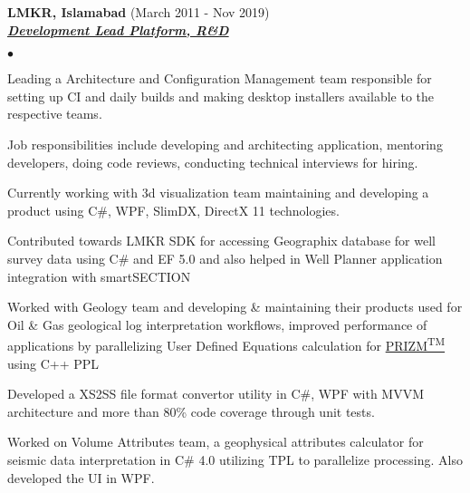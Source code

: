 \documentclass{article}
\newcommand{\employer}[3]{{ \textbf{#1} (#2)\\ \underline{\textbf{\emph{#3}}}\\  }}
\newenvironment{achievements}{\begin{list}{$\bullet$}{\topsep 0pt \itemsep -2pt}}{\vspace*{4pt}\end{list}}
\begin{document}
\employer{LMKR, Islamabad}{March 2011 - Nov 2019}{Development Lead Platform, R\&D}
	\begin{achievements}
	\item Leading a Architecture and Configuration Management team responsible for setting up CI and daily builds and making desktop installers available to the respective teams.
	\item Job responsibilities include developing and architecting application, mentoring developers, doing code reviews, conducting technical interviews for hiring. 
	\item Currently working with 3d visualization team maintaining and developing a product using C\#, WPF, SlimDX, DirectX 11 technologies.
	\item Contributed towards LMKR SDK for accessing Geographix database for well survey data using C\# and EF 5.0 and also helped in Well Planner application integration with smartSECTION
	\item Worked with Geology team and developing \& maintaining their products used for Oil \& Gas geological log interpretation workflows, improved performance of applications by parallelizing User Defined Equations calculation for \href{http://www.lmkr.com/geographix/by-solution/geographix-suite/prizm%E2%84%A2/}{PRIZM\textsuperscript{TM}} using C++ PPL 
	\item Developed a XS2SS file format convertor utility in C\#, WPF with MVVM architecture and more than 80\% code coverage through unit tests.
	\item Worked on Volume Attributes team, a geophysical attributes calculator for seismic data interpretation in C\# 4.0 utilizing TPL to parallelize processing. Also developed the UI in WPF.  
	\end{achievements}
\end{document}
